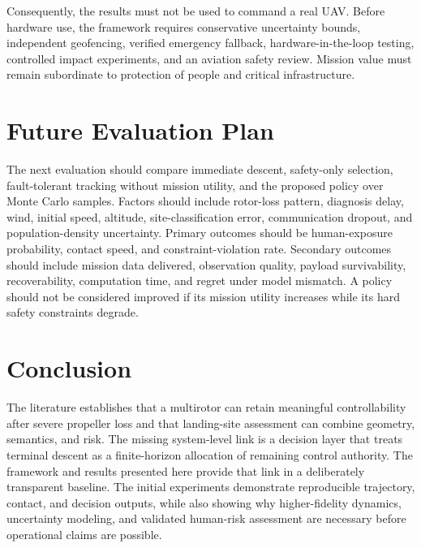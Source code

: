 \documentclass[conference]{IEEEtran}
\begin{document}
Consequently, the results must not be used to command a real UAV. Before
hardware use, the framework requires conservative uncertainty bounds,
independent geofencing, verified emergency fallback, hardware-in-the-loop
testing, controlled impact experiments, and an aviation safety review.
Mission value must remain subordinate to protection of people and critical
infrastructure.

\section{Future Evaluation Plan}
The next evaluation should compare immediate descent, safety-only selection,
fault-tolerant tracking without mission utility, and the proposed policy over
Monte Carlo samples. Factors should include rotor-loss pattern, diagnosis
delay, wind, initial speed, altitude, site-classification error, communication
dropout, and population-density uncertainty. Primary outcomes should be
human-exposure probability, contact speed, and constraint-violation rate.
Secondary outcomes should include mission data delivered, observation quality,
payload survivability, recoverability, computation time, and regret under
model mismatch. A policy should not be considered improved if its mission
utility increases while its hard safety constraints degrade.

\section{Conclusion}
The literature establishes that a multirotor can retain meaningful
controllability after severe propeller loss and that landing-site assessment
can combine geometry, semantics, and risk. The missing system-level link is a
decision layer that treats terminal descent as a finite-horizon allocation of
remaining control authority. The framework and results presented here provide
that link in a deliberately transparent baseline. The initial experiments
demonstrate reproducible trajectory, contact, and decision outputs, while also
showing why higher-fidelity dynamics, uncertainty modeling, and validated
human-risk assessment are necessary before operational claims are possible.

\balance


\end{document}

